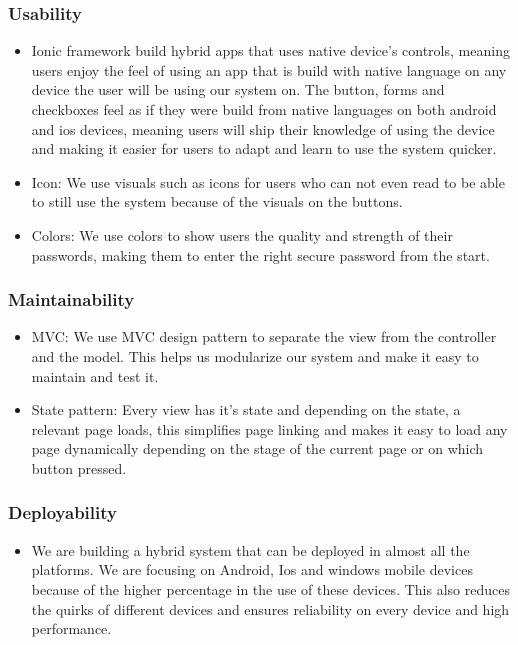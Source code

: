 \documentclass[a4paper,12pt]{article}
\begin{document}
\subsubsection{Usability}
	\begin{itemize}
		\item Ionic framework build hybrid apps that uses native device's controls, meaning users enjoy the feel of using an app that is build with native language on any device the user will be using our system on. The button, forms and checkboxes feel as if they were build from native languages on both android and ios devices, meaning users will ship their knowledge of using the device and making it easier for users to adapt and learn to use the system quicker.
		\item Icon: We use visuals such as icons for users who can not even read to be able to still use the system because of the visuals on the buttons.
		\item Colors: We use colors to show users the quality and strength of their passwords, making them to enter the right secure password from the start.
	\end{itemize}
\subsubsection{Maintainability}
	\begin{itemize}
		\item MVC: We use MVC design pattern to separate the view from the controller and the model. This helps us modularize our system and make it easy to maintain and test it. 
		\item State pattern: Every view has it's state and depending on the state, a relevant page loads, this simplifies page linking and makes it easy to load any page dynamically depending on the stage of the current page or on which button pressed.   
	\end{itemize}
\subsubsection{Deployability}
	\begin{itemize}
		\item We are building a hybrid system that can be deployed in almost all the platforms. We are focusing on Android, Ios and windows mobile devices because of the higher percentage in the use of these devices. This also reduces the quirks of different devices and ensures reliability on every device and high performance.  
	\end{itemize}
\end{document}

